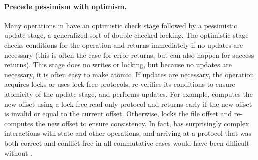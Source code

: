 




\paragraph{Precede pessimism with optimism.} Many operations
in \fs have an optimistic check stage followed by a pessimistic update
stage, a generalized sort of double-checked locking.  The optimistic
stage checks conditions for the operation and returns immediately if
no updates are necessary (this is often the case for error returns,
but can also happen for success returns).  This stage does no writes
or locking, but because no updates are necessary, it is often easy to
make atomic.  If updates are necessary, the operation acquires
locks or uses lock-free protocols, re-verifies its conditions to
ensure atomicity of the update stage, and performs updates.  For
example,  computes the new offset using a lock-free
read-only protocol and returns early if the new offset is invalid or
equal to the current offset.  Otherwise,  locks the file
offset and re-computes the new offset to ensure consistency.
%
In fact,  has surprisingly complex interactions with
state and other operations, and arriving at a protocol that was
both correct and conflict-free in all commutative cases would have
been difficult without \tool.

